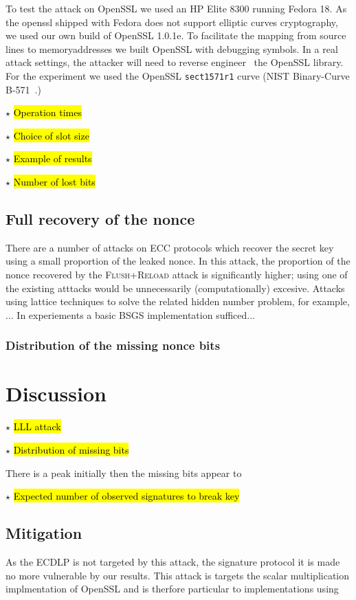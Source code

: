 \documentclass{llncs}
\newcommand{\starpar}[1]{\par{\footnotesize $\star$ \hl{#1}\par}}
\begin{document}
To test the attack on OpenSSL we used an HP Elite 8300 
running Fedora 18.
As the openssl shipped with Fedora does not support elliptic curves cryptography,
we used our own build of OpenSSL 1.0.1e. 
To facilitate the mapping from source lines to memoryaddresses we built OpenSSL with debugging symbols.
In a real attack settings, the attacker will need to reverse engineer~\cite{cipsero10software}
the OpenSSL library.
For the experiment we used the OpenSSL \texttt{sect1571r1} curve (NIST Binary-Curve B-571~\cite{fips}.)


\starpar{Operation times}
\starpar{Choice of slot size}
\starpar{Example of results}
\starpar{Number of lost bits}

\subsection{Full recovery of the nonce}\label{sub:full_nonce}
There are a number of attacks on ECC protocols which recover the secret key using a small proportion of the leaked nonce. In this attack, the proportion of the nonce recovered by the \textsc{Flush+Reload} attack is significantly higher; using one of the existing atttacks would be unnecessarily (computationally) excesive. Attacks using lattice techniques to solve the related hidden number problem, for example, ... 
In experiements a basic BSGS implementation sufficed... 

\subsubsection*{Distribution of the missing nonce bits}

\section{Discussion}\label{sec:discussion}
\starpar{LLL attack}
\starpar{Distribution of missing bits} There is a peak initially then the missing bits appear to 
\starpar{Expected number of observed signatures to break key}


\subsection*{Mitigation}
As the ECDLP is not targeted by this attack, the signature protocol it is made no more vulnerable by our results. This attack is targets the scalar multiplication implmentation of OpenSSL and is therfore particular to implementations using 
\end{document}
